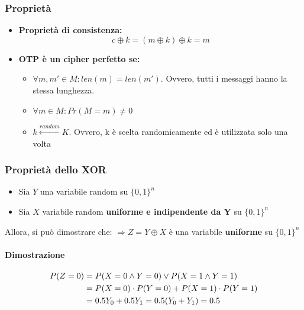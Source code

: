 \documentclass[a4paper,12pt]{article}
\begin{document}
\subsubsection{Proprietà}
\begin{itemize}
	\item \textbf{Proprietà di consistenza:} $$ c \oplus k = (m \oplus k) \oplus k = m$$
	\item \textbf{OTP è un cipher perfetto se:}
	\begin{itemize}
		\item $\forall m, m' \in M : len(m) = len(m')$. Ovvero, tutti i messaggi hanno la stessa lunghezza.
		\item $\forall m \in M : Pr(M = m) \neq 0$
		\item $k \xleftarrow{random} K$. Ovvero, k è scelta randomicamente ed è utilizzata solo una volta
	\end{itemize}
\end{itemize}

\subsubsection{Proprietà dello XOR}
\begin{itemize}
	\item Sia $Y$ una variabile random su $\{0,1\}^n$
	\item Sia $X$ variabile random \textbf{uniforme e indipendente da Y} su $\{0,1\}^n$
\end{itemize}
Allora, si può dimostrare che:
$\Rightarrow Z = Y \oplus X$ è una variabile \textbf{uniforme} su $\{0,1\}^n$ 

\paragraph{Dimostrazione}
\begin{align}
P(Z = 0) &= P(X = 0 \land Y = 0) \lor P(X = 1 \land Y = 1) \notag\\
& = P(X = 0) \cdot P(Y = 0) + P(X = 1) \cdot P(Y = 1) \notag\\
& = 0.5Y_0 + 0.5Y_1 = 0.5(Y_0 + Y_1) = 0.5 \notag
\end{align}
\end{document}
